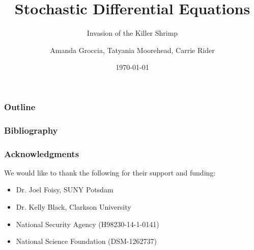 \documentclass{beamer} %
\begin{document}
\author{Amanda Groccia, Tatyania Moorehead, Carrie Rider}



\title{Stochastic Differential Equations}
\subtitle{Invasion of the Killer Shrimp}
\date{\today}

\begin{frame}
  \titlepage
\end{frame}


\begin{frame}
  \frametitle{Outline}
  \tableofcontents[hideallsubsections]
\end{frame}













\begin{frame}
  \frametitle{Bibliography}

  
  
  
\end{frame}


\begin{frame}
  \frametitle{Acknowledgments}
  
  We would like to thank the following for their support and funding: 
  
 \begin{itemize}
 \item Dr. Joel Foisy, SUNY Potsdam
 \item Dr. Kelly Black, Clarkson University
 \item National Security Agency (H98230-14-1-0141)
 \item National Science Foundation (DSM-1262737)
 \end{itemize}
\end{frame}
\end{document}
